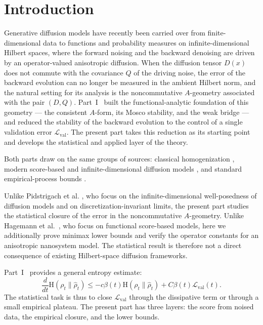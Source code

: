 \documentclass{article}
\newcommand{\Ent}{\mathrm H}
\newcommand{\Eval}{\mathcal L_{\mathrm{val}}}
\begin{document}
\section{Introduction}
Generative diffusion models have recently been carried over from
finite-dimensional data to functions and probability measures on
infinite-dimensional Hilbert spaces, where the forward noising and the backward
denoising are driven by an operator-valued anisotropic diffusion. When the
diffusion tensor \(D(x)\) does not commute with the covariance \(Q\) of the
driving noise, the error of the backward evolution can no longer be measured in
the ambient Hilbert norm, and the natural setting for its analysis is the
noncommutative \(A\)-geometry associated with the pair \((D,Q)\).
Part~I~\cite{ShchetininPartI} built the functional-analytic foundation of this
geometry --- the consistent \(A\)-form, its Mosco stability, and the weak bridge
--- and reduced the stability of the backward evolution to the control of a
single validation error \(\Eval\). The present part takes this reduction as its
starting point and develops the statistical and applied layer of the theory.

Both parts draw on the same groups of sources: classical homogenization \cite{Allaire,CioranescuDonato}, modern score-based and infinite-dimensional diffusion models \cite{Song,Pidstrigach2024,Hagemann2025}, and standard empirical-process bounds \cite{Wainwright,vanDerVaartWellner}.


Unlike Pidstrigach et al. \cite{Pidstrigach2024}, who focus on the
infinite-dimensional well-posedness of diffusion models and on
discretization-invariant limits, the present part studies the statistical
closure of the error in the noncommutative \(A\)-geometry. Unlike
Hagemann et al.~\cite{Hagemann2025}, who focus on functional score-based models,
here we additionally prove minimax lower bounds and verify the operator constants
for an anisotropic nanosystem model. The statistical result is therefore not a
direct consequence of existing Hilbert-space diffusion frameworks.


Part~I~\cite{ShchetininPartI} provides a general entropy estimate:
\[
        \frac{d}{dt}\Ent(\rho_t\|\hat\rho_t)
        \le
        -c\beta(t)\Ent(\rho_t\|\hat\rho_t)+C\beta(t)\Eval(t).
\]
The statistical task is thus to close \(\Eval\) through the dissipative term or
through a small empirical plateau. The present part has three layers: the score
from noised data, the empirical closure, and the lower bounds.
\end{document}
